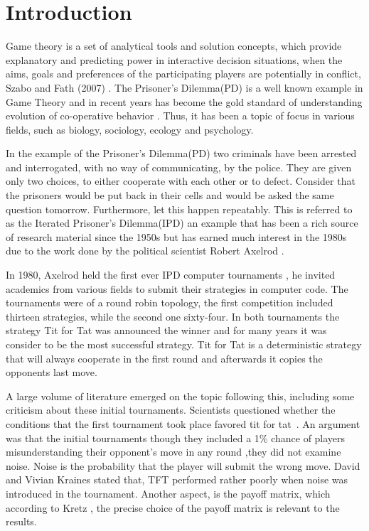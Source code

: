 \chapter{Introduction}
Game theory is a set of analytical tools and solution concepts, which provide
explanatory and predicting power in interactive decision situations, when the
aims, goals and preferences of the participating players are potentially in
conflict, Szabo and Fath (2007) \cite{Szabo2007}. The Prisoner's Dilemma(PD) is a well
known example in Game Theory and in recent years has become the gold standard of
understanding evolution of co-operative behavior \cite{Lorberbaum1994}.
Thus, it has been a topic of focus in various fields, such as biology,
sociology, ecology and psychology.

In the example of the Prisoner's Dilemma(PD) two criminals have been arrested
and interrogated, with no way of communicating, by the police. They are given
only two choices, to either cooperate with each other or to defect.
Consider that the prisoners would be put back in their cells and would be asked
the same question tomorrow. Furthermore, let this happen repeatably. This is
referred to as the Iterated Prisoner's Dilemma(IPD) an example that has been a
rich source of research material since the 1950s but has earned much interest in
the 1980s due to the work done by the political scientist Robert Axelrod
\cite{Axelrod1980a, Axelrod1980b, Axelrod1981}.

In 1980, Axelrod held the first ever IPD computer tournaments \cite{Axelrod1980a,
Axelrod1980b}, he invited
academics from various fields to submit their strategies in computer code. The
tournaments were of a round robin topology, the first competition included thirteen
strategies, while the second one sixty-four. In both tournaments the strategy Tit
for Tat was announced the winner and for many years it was consider to be the
most successful strategy. Tit for Tat is a deterministic strategy that will
always cooperate in the first round and afterwards it copies the opponents last
move.

A large volume of literature emerged on the topic following this, including some
criticism about these initial tournaments. Scientists questioned whether the
conditions that the first tournament took place favored tit for tat~\cite{RePEc:mtp:titles:0262023636}.
An argument was that the initial tournaments though they included
a 1\% chance of players misunderstanding their opponent's move in any round
,they did not examine noise. Noise is the probability
that the player will submit the wrong move. David and Vivian Kraines \cite{kraines-1989a}
stated that, TFT performed rather poorly when noise was introduced in the tournament.
Another aspect, is the payoff matrix, which according to Kretz \cite{Kretz2011},
the precise choice of the payoff matrix is relevant to the results.

